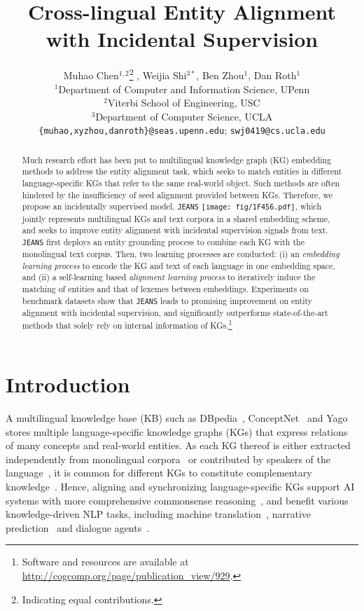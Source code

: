\documentclass[11pt,a4paper]{article}
\title{Cross-lingual Entity Alignment with Incidental Supervision}
\author{Muhao Chen$^{1,2}$\thanks{\indent Indicating equal contributions.} , Weijia Shi$^{3*}$, Ben Zhou$^1$, Dan Roth$^1$\\
  $^1$Department of Computer and Information Science, UPenn\\
  $^2$Viterbi School of Engineering, USC\\
  $^3$Department of Computer Science, UCLA\\
  \texttt{\{muhao,xyzhou,danroth\}@seas.upenn.edu};  \texttt{swj0419@cs.ucla.edu}\\}
\date{}
\newcommand{\modelname}[0]{\texttt{JEANS}\xspace}
\begin{document}
\maketitle
\begin{abstract}
Much research effort has been put to multilingual knowledge graph (KG) embedding methods to address the entity alignment task, which seeks to match entities in different language-specific KGs that refer to the same real-world object.
Such methods are often hindered by the insufficiency of seed alignment provided between KGs. 
Therefore, we propose an incidentally supervised model, \modelname 
\texttt{[image: fig/1F456.pdf]}, 
which jointly represents multilingual KGs and text corpora in a shared embedding scheme,
and seeks to improve entity alignment with incidental supervision signals from text.
\modelname first deploys an entity grounding process to combine each KG with the monolingual text corpus.
Then, two learning processes are conducted: (i) an \emph{embedding learning process} to encode the KG and text of each language in one embedding space, and (ii) a self-learning based \emph{alignment learning process} to iteratively induce the matching of entities and that of lexemes between embeddings.
Experiments on benchmark datasets show that \modelname leads to promising improvement on entity alignment with incidental supervision, and significantly outperforms state-of-the-art methods that solely rely on internal information of KGs.\footnote{Software and resources are available at \url{http://cogcomp.org/page/publication_view/929}.}


\end{abstract}

\section{Introduction}



A multilingual knowledge base (KB) such as DBpedia~\cite{lehmann2015dbpedia}, ConceptNet~\cite{speer2017conceptnet} and Yago~\cite{mahdisoltani2014yago3} stores multiple language-specific knowledge graphs (KGs) that express relations of many concepts and real-world entities.
As each KG thereof is either extracted independently from  monolingual corpora~\cite{lehmann2015dbpedia,mahdisoltani2014yago3} or contributed by speakers of the language~\cite{speer2017conceptnet,mitchell2018never},
it is common for different KGs to constitute complementary knowledge~\cite{bleiholder2009data,bryl2014learning}.
Hence, aligning and synchronizing language-specific KGs support AI systems with more comprehensive commonsense reasoning~\cite{lin2019kagnet,li2019teaching,yeo2018machine},
and benefit various knowledge-driven NLP tasks, including machine translation~\cite{moussallem2018machine}, narrative prediction~\cite{chen2019incorporating} and dialogue agents~\cite{sun2019dream}.
\end{document}
